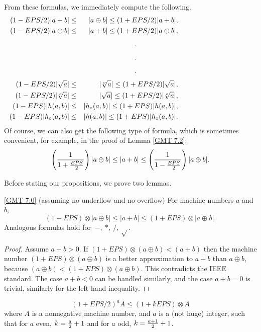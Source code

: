  
From these formulas, we immediately compute the following.
\begin{eqnarray*}
(1 - EPS/2) |a + b| &\leq& |a \oplus b| 
\leq (1 + EPS/2) |a+b|, \\ 
  (1 - EPS/2) |a \oplus b|& \leq& |a + b| 
\leq (1 + EPS/2) |a \oplus b|,\\
\noalign{\vskip4pt}
\noalign{\hfil .\hfil }  \noalign{\vskip4pt}
\noalign{\hfil .\hfil } \noalign{\vskip4pt}
\noalign{\hfil .\hfil } \noalign{\vskip4pt}
(1 - EPS/2) |\sqrt a| &\leq&  |\root o \of a| 
\leq (1 + EPS/2) |\sqrt a|, \\ (1 - EPS/2) |\root o \of a|&\leq&  |\sqrt a| 
\leq (1 + EPS/2) |\root o \of a|, \\  (1 - EPS) |h(a,b)| &\leq&  |h_\circ (a,b)| 
\leq (1 + EPS) |h(a,b)|, \\  (1 - EPS) |h_\circ (a,b)| &\leq& |h(a,b)| 
\leq (1 + EPS) |h_\circ (a,b)|.
\end{eqnarray*}
Of course, we can also get the following type of formula, which is sometimes convenient,
 for example, in the proof of Lemma \ref{GMT 7.2}:
$$\left({1 \over {1 + {EPS \over 2}}}\right) |a \oplus b| \leq |a + b| 
\leq \left({1 \over {1 - {EPS \over 2}}}\right) |a \oplus b|.$$

Before stating our propositions, we prove two lemmas.

\begin{lemma}{\ref{GMT 7.0} {\textrm (assuming no underflow and no overflow)}} 
For machine numbers $a$ and $b${\textrm ,}
$$(1 - EPS) \otimes |a \oplus b| \le |a + b| \le (1 + EPS) \otimes |a \oplus b|.$$
 Analogous formulas hold for $\ -,\ *,\ /,\ \sqrt{}$.
\end{lemma}

\begin{proof}{}
Assume $a+b > 0$.  
If $(1+EPS) \otimes (a \oplus b) < (a+b)$ then the machine number 
$(1+EPS) \otimes (a \oplus b)$ is a better approximation to $a+b$ than $a \oplus b$, because $(a \oplus b) 
< (1+EPS) \otimes (a \oplus b)$.  This contradicts the IEEE standard.  The case $a+b < 0$ can be handled similarly, and the
case $a+b = 0$ is trivial, similarly for the left-hand inequality.
\end{proof}

\begin{lemma}\label{GMT 7.1} $$(1 + EPS/2)^a A \le (1 + k EPS) \otimes A$$ 
 where $A$ is a nonnegative machine number{\textrm ,} and $a$ is a {\textrm (}\/not huge\/{\textrm )} integer{\textrm ,} such that
for $a$ even{\textrm ,} $k = {a \over 2} + 1$ and  for $a$ odd, $k = {a+1 \over 2} + 1$. 
\end{lemma}

